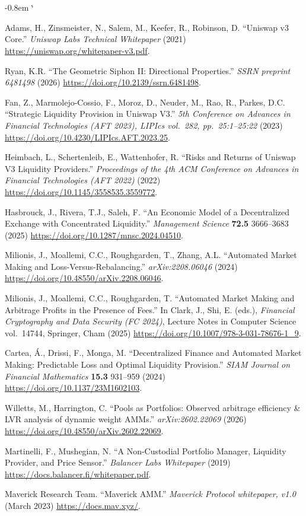 \documentclass[11pt,a4paper]{article}
\makeatletter
\renewenvironment{thebibliography}[1]
  {\section*{\refname}%
   \fontsize{10pt}{12pt}\selectfont
   \list{\@biblabel{\@arabic\c@enumiv}}%
        {\settowidth\labelwidth{\@biblabel{#1}}%
         \leftmargin\labelwidth
         \advance\leftmargin-0.8em
         \advance\leftmargin\labelsep
         \setlength\itemindent{1em}%
         \setlength\itemsep{6pt plus 1pt minus 1pt}%
         \setlength\parsep{0pt}%
         \usecounter{enumiv}%
         \let\p@enumiv\@empty
         \renewcommand\theenumiv{\@arabic\c@enumiv}}%
   \sloppy\clubpenalty4000\widowpenalty4000\sfcode`\.\@m}
  {\def\@noitemerr{\@latex@warning{Empty `thebibliography' environment}}%
   \endlist}
\makeatother
\begin{document}
\pagestyle{plain}
\begin{thebibliography}{9}

Adams, H., Zinsmeister, N., Salem, M., Keefer, R., Robinson, D. ``Uniswap v3 Core.'' \emph{Uniswap Labs Technical Whitepaper} (2021) \url{https://uniswap.org/whitepaper-v3.pdf}.

Ryan, K.R. ``The Geometric Siphon II: Directional Properties.'' \emph{SSRN preprint 6481498} (2026) \url{https://doi.org/10.2139/ssrn.6481498}.

Fan, Z., Marmolejo-Cossio, F., Moroz, D., Neuder, M., Rao, R., Parkes, D.C. ``Strategic Liquidity Provision in Uniswap V3.'' \emph{5th Conference on Advances in Financial Technologies (AFT 2023), LIPIcs vol.~282, pp.~25:1--25:22} (2023) \url{https://doi.org/10.4230/LIPIcs.AFT.2023.25}.

Heimbach, L., Schertenleib, E., Wattenhofer, R. ``Risks and Returns of Uniswap V3 Liquidity Providers.'' \emph{Proceedings of the 4th ACM Conference on Advances in Financial Technologies (AFT 2022)} (2022) \url{https://doi.org/10.1145/3558535.3559772}.

Hasbrouck, J., Rivera, T.J., Saleh, F. ``An Economic Model of a Decentralized Exchange with Concentrated Liquidity.'' \emph{Management Science} \textbf{72.5} 3666--3683 (2025) \url{https://doi.org/10.1287/mnsc.2024.04510}.

Milionis, J., Moallemi, C.C., Roughgarden, T., Zhang, A.L. ``Automated Market Making and Loss-Versus-Rebalancing.'' \emph{arXiv:2208.06046} (2024) \url{https://doi.org/10.48550/arXiv.2208.06046}.

Milionis, J., Moallemi, C.C., Roughgarden, T. ``Automated Market Making and Arbitrage Profits in the Presence of Fees.'' In Clark, J., Shi, E. (eds.), \emph{Financial Cryptography and Data Security (FC 2024)}, Lecture Notes in Computer Science vol.~14744, Springer, Cham (2025) \url{https://doi.org/10.1007/978-3-031-78676-1_9}.

Cartea, \'A., Drissi, F., Monga, M. ``Decentralized Finance and Automated Market Making: Predictable Loss and Optimal Liquidity Provision.'' \emph{SIAM Journal on Financial Mathematics} \textbf{15.3} 931--959 (2024) \url{https://doi.org/10.1137/23M1602103}.

Willetts, M., Harrington, C. ``Pools as Portfolios: Observed arbitrage efficiency \& LVR analysis of dynamic weight AMMs.'' \emph{arXiv:2602.22069} (2026) \url{https://doi.org/10.48550/arXiv.2602.22069}.

Martinelli, F., Mushegian, N. ``A Non-Custodial Portfolio Manager, Liquidity Provider, and Price Sensor.'' \emph{Balancer Labs Whitepaper} (2019) \url{https://docs.balancer.fi/whitepaper.pdf}.

Maverick Research Team. ``Maverick AMM.'' \emph{Maverick Protocol whitepaper, v1.0} (March 2023) \url{https://docs.mav.xyz/}.

\end{thebibliography}
\end{document}
